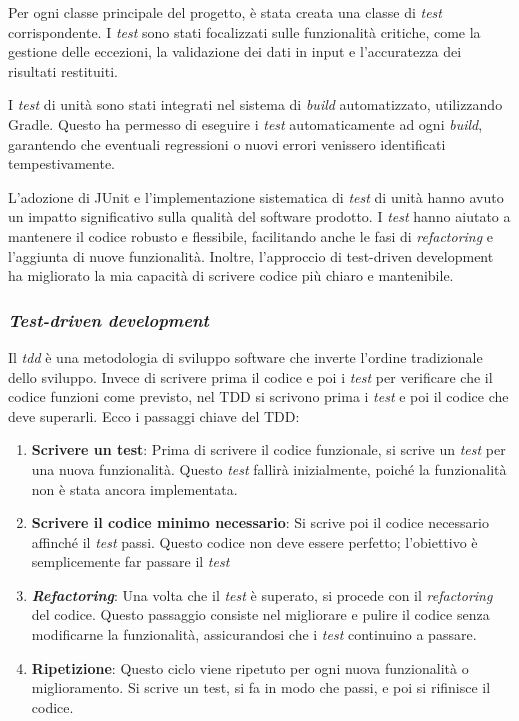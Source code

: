 Per ogni classe principale del progetto, è stata creata una classe di \textit{test} corrispondente. 
I \textit{test} sono stati focalizzati sulle funzionalità critiche, come la gestione delle eccezioni, 
la validazione dei dati in input e l'accuratezza dei risultati restituiti.

I \textit{test} di unità sono stati integrati nel sistema di \textit{build} automatizzato, utilizzando Gradle. 
Questo ha permesso di eseguire i \textit{test} automaticamente ad ogni \textit{build}, 
garantendo che eventuali regressioni o nuovi errori venissero identificati tempestivamente.

L'adozione di JUnit e l'implementazione sistematica di \textit{test} di unità hanno avuto un impatto significativo sulla qualità del software prodotto. 
I \textit{test} hanno aiutato a mantenere il codice robusto e flessibile, facilitando anche le fasi di \textit{refactoring} e l'aggiunta di nuove funzionalità. 
Inoltre, l'approccio di test-driven development ha migliorato la mia capacità di scrivere codice più chiaro e mantenibile.

\subsubsection{\textit{Test-driven development}}
Il \textit{\gls{tdd}} è una metodologia di sviluppo software che inverte l'ordine tradizionale dello sviluppo. 
Invece di scrivere prima il codice e poi i \textit{test} per verificare che il codice funzioni come previsto, nel TDD si scrivono prima 
i \textit{test} e poi il codice che deve superarli. Ecco i passaggi chiave del TDD:
\begin{enumerate}
  \item \textbf{Scrivere un test}: Prima di scrivere il codice funzionale, si scrive un \textit{test} per una nuova funzionalità. Questo \textit{test} fallirà inizialmente, poiché la funzionalità non è stata ancora implementata.
  \item \textbf{Scrivere il codice minimo necessario}: Si scrive poi il codice necessario affinché il \textit{test} passi. Questo codice non deve essere perfetto; l'obiettivo è semplicemente far passare il \textit{test} 
  \item \textit{\textbf{Refactoring}}: Una volta che il \textit{test} è superato, si procede con il \textit{refactoring} del codice. Questo passaggio consiste nel migliorare e pulire il codice senza modificarne la funzionalità, assicurandosi che i \textit{test} continuino a passare.
  \item \textbf{Ripetizione}: Questo ciclo viene ripetuto per ogni nuova funzionalità o miglioramento. Si scrive un test, si fa in modo che passi, e poi si rifinisce il codice.
\end{enumerate}

